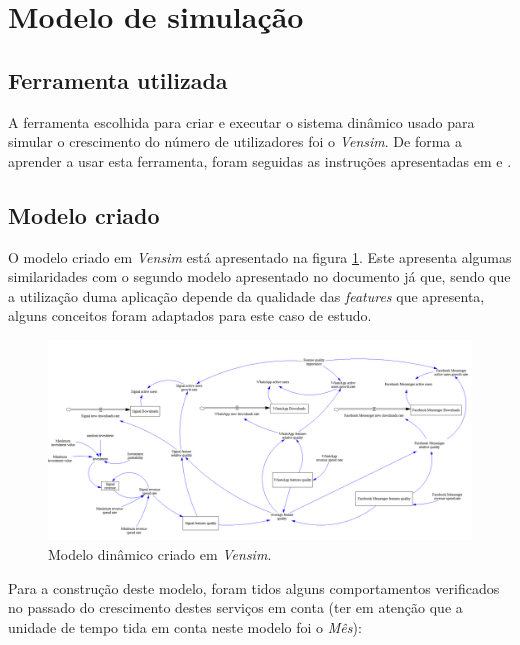 \section{Modelo de simulação}
\label{sec:model}

\subsection{Ferramenta utilizada}
A ferramenta escolhida para criar e executar o sistema dinâmico usado para simular o crescimento do número de utilizadores foi o \textit{Vensim}. De forma a aprender a usar esta ferramenta, foram seguidas as instruções apresentadas em \cite{vensim_youtube} e \cite{teacher_vensim}.

\subsection{Modelo criado}
O modelo criado em \textit{Vensim} está apresentado na figura \ref{model:vensim_model}. Este apresenta algumas similaridades com o segundo modelo apresentado no documento \cite{teacher_vensim} já que, sendo que a utilização duma aplicação depende da qualidade das \textit{features} que apresenta, alguns conceitos foram adaptados para este caso de estudo.

\begin{figure}[H]
   \begin{center}
       \includegraphics[width=17cm]{img/vensim_model.png}
       \caption{Modelo dinâmico criado em \textit{Vensim}.}
       \label{model:vensim_model}
   \end{center}
\end{figure}

Para a construção deste modelo, foram tidos alguns comportamentos verificados no passado do crescimento destes serviços em conta (ter em atenção que a unidade de tempo tida em conta neste modelo foi o \textit{Mês}):

